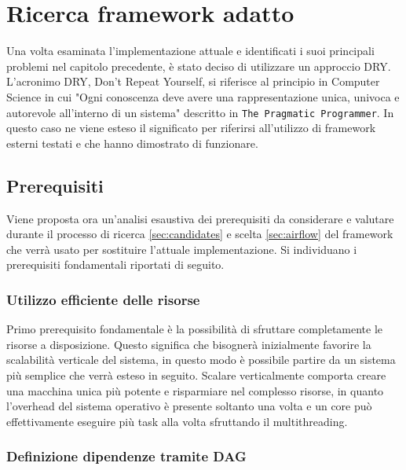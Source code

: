 \chapter{Ricerca framework adatto}
\label{sec:ricerca_framework}

Una volta esaminata l'implementazione attuale e identificati i suoi principali
problemi nel capitolo precedente, è stato deciso di utilizzare un approccio DRY.
L'acronimo DRY, Don't Repeat Yourself, si riferisce al principio in Computer
Science in cui "Ogni conoscenza deve avere una rappresentazione unica, univoca e
autorevole all’interno di un sistema" descritto in \texttt{The Pragmatic
Programmer}\cite{thomas2019pragmatic}. In questo caso ne viene esteso il
significato per riferirsi all'utilizzo di framework esterni testati e che hanno
dimostrato di funzionare.

\section{Prerequisiti}
\label{sec:prerequisiti}

Viene proposta ora un'analisi esaustiva dei prerequisiti da considerare e valutare
durante il processo di ricerca \ref{sec:candidates} e scelta \ref{sec:airflow} del
framework che verrà usato per sostituire l'attuale implementazione. Si
individuano i prerequisiti fondamentali riportati di seguito.

\subsection{Utilizzo efficiente delle risorse}
\label{sub:resource_usage}

Primo prerequisito fondamentale è la possibilità di sfruttare completamente le risorse
a disposizione. Questo significa che bisognerà inizialmente favorire la
scalabilità verticale del sistema, in questo modo è possibile partire da un sistema
più semplice che verrà esteso in seguito. Scalare verticalmente comporta creare
una macchina unica più potente e risparmiare nel complesso risorse, in quanto l'overhead
del sistema operativo è presente soltanto una volta e un core può effettivamente
eseguire più task alla volta sfruttando il multithreading.

\subsection{Definizione dipendenze tramite DAG}
\label{sub:deps_definition}

